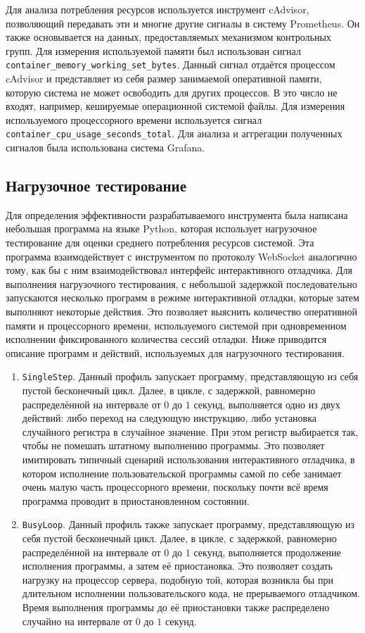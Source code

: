 \documentclass[a4paper,article,14pt]{extarticle}
\begin{document}
Для анализа потребления ресурсов используется инструмент cAdvisor\cite{cadvisor}, позволяющий передавать эти и многие другие сигналы в систему Prometheus. Он также основывается на данных, предоставляемых механизмом контрольных групп. Для измерения используемой памяти был использован сигнал \texttt{container\_memory\_working\_set\_bytes}. Данный сигнал отдаётся процессом cAdvisor и представляет из себя размер занимаемой оперативной памяти, которую система не может освободить для других процессов. В это число не входят, например, кешируемые операционной системой файлы. Для измерения используемого процессорного времени используется сигнал \texttt{container\_cpu\_usage\_seconds\_total}. Для анализа и аггрегации полученных сигналов была использована система Grafana\cite{grafana}.

\subsection{Нагрузочное тестирование}

Для определения эффективности разрабатываемого инструмента была написана небольшая программа на языке Python, которая использует нагрузочное тестирование для оценки среднего потребления ресурсов системой. Эта программа взаимодействует с инструментом по протоколу WebSocket аналогично тому, как бы с ним взаимодействовал интерфейс интерактивного отладчика. Для выполнения нагрузочного тестирования, с небольшой задержкой последовательно запускаются несколько программ в режиме интерактивной отладки, которые затем выполняют некоторые действия. Это позволяет выяснить количество оперативной памяти и процессорного времени, используемого системой при одновременном исполнении фиксированного количества сессий отладки. Ниже приводится описание программ и действий, используемых для нагрузочного тестирования.

\begin{enumerate}
    \item \texttt{SingleStep}. Данный профиль запускает программу, представляющую из себя пустой бесконечный цикл. Далее, в цикле, с задержкой, равномерно распределённой на интервале от $0$ до $1$ секунд, выполняется одно из двух действий: либо переход на следующую инструкцию, либо установка случайного регистра в случайное значение. При этом регистр выбирается так, чтобы не помешать штатному выполнению программы. Это позволяет имитировать типичный сценарий использования интерактивного отладчика, в котором исполнение пользовательской программы самой по себе занимает очень малую часть процессорного времени, поскольку почти всё время программа проводит в приостановленном состоянии.
    \item \texttt{BusyLoop}. Данный профиль также запускает программу, представляющую из себя пустой бесконечный цикл. Далее, в цикле, с задержкой, равномерно распределённой на интервале от $0$ до $1$ секунд, выполняется продолжение исполнения программы, а затем её приостановка. Это позволяет создать нагрузку на процессор сервера, подобную той, которая возникла бы при длительном исполнении пользовательского кода, не прерываемого отладчиком. Время выполнения программы до её приостановки также распределено случайно на интервале от $0$ до $1$ секунд.
\end{enumerate}
\end{document}
